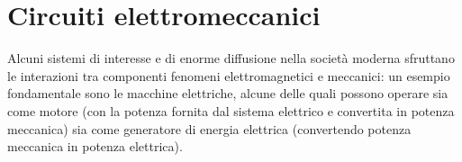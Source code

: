 \documentclass[letterpaper,10pt,italian]{jupyterBook}
\begin{document}
\section{Circuiti elettromeccanici}
\label{\detokenize{ch/circuits-electromechanic:circuiti-elettromeccanici}}\label{\detokenize{ch/circuits-electromechanic:classical-electromagnetism-circuits-electromechanic}}\label{\detokenize{ch/circuits-electromechanic::doc}}
\sphinxAtStartPar
Alcuni sistemi di interesse e di enorme diffusione nella società moderna sfruttano le interazioni tra componenti fenomeni elettromagnetici e meccanici: un esempio fondamentale sono le macchine elettriche, alcune delle quali possono operare sia come motore (con la potenza fornita dal sistema elettrico e convertita in potenza meccanica) sia come generatore di energia elettrica (convertendo potenza meccanica in potenza elettrica).
\end{document}
